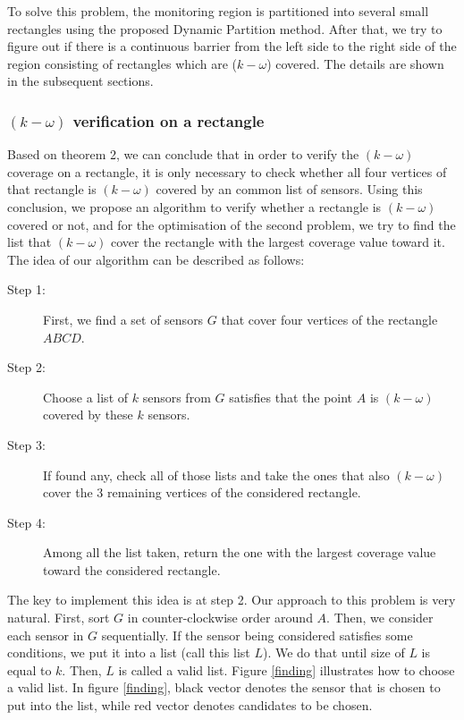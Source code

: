 To solve this problem, the monitoring region is partitioned into several small rectangles using the proposed Dynamic Partition method. After that, we try to figure out if there is a continuous barrier from the left side to the right side of the region consisting of rectangles which are ($k-\omega$) covered. The details are shown in the subsequent sections.

\subsubsection{$(k-\omega)$ verification on a rectangle}

Based on theorem 2, we can conclude that in order to verify the $(k-\omega)$ coverage on a rectangle, it is only necessary to check whether all four vertices of that rectangle is $(k-\omega)$ covered by an common list of sensors. Using this conclusion, we propose an algorithm to verify whether a rectangle is $(k-\omega)$ covered or not, and for the optimisation of the second problem, we try to find the list that $(k-\omega)$ cover the rectangle with the largest coverage value toward it. 
The idea of our algorithm can be described as follows:
\begin{description}
	\item[Step 1:] First, we find a set of sensors $G$ that cover four vertices of the rectangle $ ABCD $.
	\item[Step 2:] Choose a list of $k$ sensors from $G$ satisfies that the point $A$ is $(k-\omega)$ covered by these $k$ sensors.
	\item[Step 3:] If found any, check all of those lists and take the ones that also $(k-\omega)$ cover the 3 remaining vertices of the considered rectangle.
	\item[Step 4:] Among all the list taken, return the one with the largest coverage value toward the considered rectangle.
\end{description}
The key to implement this idea is at step 2. Our approach to this problem is very natural. First, sort $G$ in counter-clockwise order around $A$. Then, we consider each sensor in $G$ sequentially. If the sensor being considered satisfies some conditions, we put it into a list (call this list $L$). We do that until size of $L$ is equal to $k$. Then, $L$ is called a valid list. Figure \ref{finding} illustrates how to choose a valid list. In figure \ref{finding}, black vector denotes the sensor that is chosen to put into the list, while red vector denotes candidates to be chosen.

